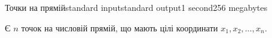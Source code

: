 \begin{problem}{Точки на прямій}{standard input}{standard output}{1 second}{256 megabytes}

Є $n$ точок на числовій прямій, що мають цілі координати $x_1, x_2, \ldots, x_n$.

\Example

\begin{example}
%
\end{example}

\end{problem}
